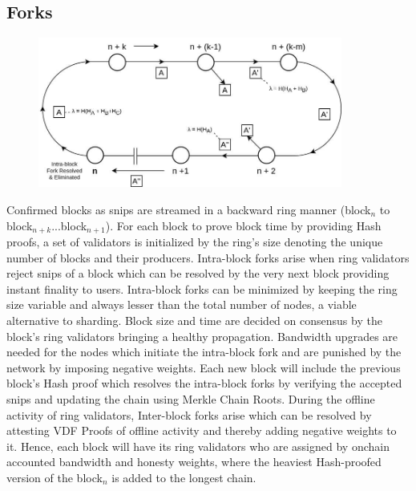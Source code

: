 \documentclass[a4paper,10pt]{article}
\begin{document}
 \subsection{Forks}
\begin{figure}[h]
\begin{center}
\includegraphics[width=10cm]{intrafork}
\end{center}
\end{figure}
Confirmed blocks as snips are streamed in a backward ring manner (block$_n$ to block$_{n+k}$...block$_{n+1}$). For each block to prove block time by providing Hash proofs, a set of validators is initialized by the ring's size denoting the unique number of blocks and their producers. Intra-block forks arise when ring validators reject snips of a block which can be resolved by the very next block providing instant finality to users. Intra-block forks can be minimized by keeping the ring size variable and always lesser than the total number of nodes, a viable alternative to sharding. Block size and time are decided on consensus by the block's ring validators bringing a healthy propagation. Bandwidth upgrades are needed for the nodes which initiate the intra-block fork and are punished by the network by imposing negative weights. Each new block will include the previous block's Hash proof which resolves the intra-block forks by verifying the accepted snips and updating the chain using Merkle Chain Roots. During the offline activity of ring validators, Inter-block forks arise which can be resolved by attesting VDF Proofs of offline activity and thereby adding negative weights to it. Hence, each block will have its ring validators who are assigned by onchain accounted bandwidth and honesty weights, where the heaviest Hash-proofed version of the block$_n$ is added to the longest chain.
\end{document}
